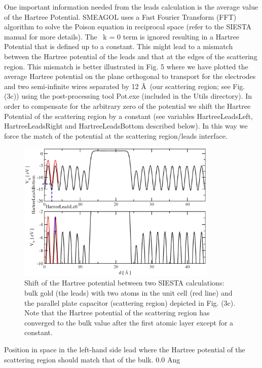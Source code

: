 \documentclass[11pt]{article}
\begin{document}
{One important information needed from the leads calculation is the average value of the Hartree Potential. SMEAGOL uses a Fast Fourier Transform (FFT) algorithm to solve the Poison equation in reciprocal space (refer to the SIESTA manual for more details). The ~k = 0 term is ignored resulting in a Hartree Potential that is defined up to a constant. This might lead to a mismatch between the Hartree potential of the leads and that at the edges of the scattering region. This mismatch is better illustrated in Fig. 5 where we have plotted the average Hartree potential on the plane orthogonal to transport for the electrodes and two semi-infinite wires separated by 12 \AA~(our scattering region; see Fig. (3c)) using the post-processing tool Pot.exe (included in the Utils directory).  In order to compensate for the arbitrary zero of the potential we shift the Hartree Potential of the scattering region by a constant (see variables HartreeLeadsLeft, HartreeLeadsRight and HartreeLeadsBottom described below). In this way we force the match of the potential at the scattering region/leads interface.
\begin{figure}
\center
\includegraphics[width=9.5cm,clip=true]{fig/Fig5}
\caption{Shift of the Hartree potential between two SIESTA calculations: bulk gold (the leads)
with two atoms in the unit cell (red line) and the parallel plate capacitor (scattering region)
depicted in Fig. (3c). Note that the Hartree potential of the scattering region has converged to
the bulk value after the first atomic layer except for a constant.}
\label{fig:potential}
\end{figure}


{Position in space in the left-hand side lead where the Hartree potential of the scattering region should match that of the bulk.}
{0.0 Ang}

}
\end{document}
